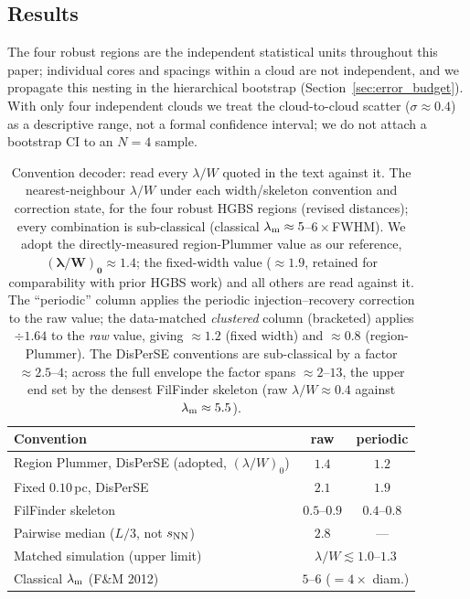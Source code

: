 \documentclass[usenatbib,twoside,twocolumn]{mnras}
\begin{document}
\subsection{Results}

The four robust regions are the independent statistical units throughout this paper; individual cores and spacings within a cloud are not independent, and we propagate this nesting in the hierarchical bootstrap (Section~\ref{sec:error_budget}). With only four independent clouds we treat the cloud-to-cloud scatter ($\sigma\approx0.4$) as a descriptive range, not a formal confidence interval; we do not attach a bootstrap CI to an $N=4$ sample.

\begin{table}
\caption{Convention decoder: read every $\lambda/W$ quoted in the text against it. The nearest-neighbour $\lambda/W$ under each width/skeleton convention and correction state, for the four robust HGBS regions (revised distances); every combination is sub-classical (classical $\lambda_{\rm m}\approx5$--$6\times$FWHM). We adopt the directly-measured region-Plummer value as our reference, $\boldsymbol{(\lambda/W)_0\approx1.4}$; the fixed-width value ($\approx1.9$, retained for comparability with prior HGBS work) and all others are read against it. The ``periodic'' column applies the periodic injection--recovery correction to the raw value; the data-matched \emph{clustered} column (bracketed) applies $\div1.64$ to the \emph{raw} value, giving $\approx1.2$ (fixed width) and $\approx0.8$ (region-Plummer). The DisPerSE conventions are sub-classical by a factor $\approx2.5$--$4$; across the full envelope the factor spans $\approx2$--$13$, the upper end set by the densest FilFinder skeleton (raw $\lambda/W\approx0.4$ against $\lambda_{\rm m}\approx5.5$).}
\label{tab:headline}
\footnotesize
\setlength{\tabcolsep}{4pt}
\begin{tabular}{p{4.2cm}cc}
\toprule
Convention & raw & periodic \\
\midrule
Region Plummer, DisPerSE (adopted, $(\lambda/W)_0$) & $\mathbf{1.4}$ & $1.2$ \\
Fixed $0.10$\,pc, DisPerSE & $2.1$ & $1.9$ \\
FilFinder skeleton & $0.5$--$0.9$ & $0.4$--$0.8$ \\
Pairwise median ($L/3$, not $s_{\rm NN}$) & $2.8$ & --- \\
\midrule
Matched simulation (upper limit) & \multicolumn{2}{c}{$\lambda/W\lesssim1.0$--$1.3$} \\
Classical $\lambda_{\rm m}$ (F\&M 2012) & \multicolumn{2}{c}{$5$--$6$ ($=4\times$ diam.)} \\

\end{tabular}
\end{table}
\end{document}
